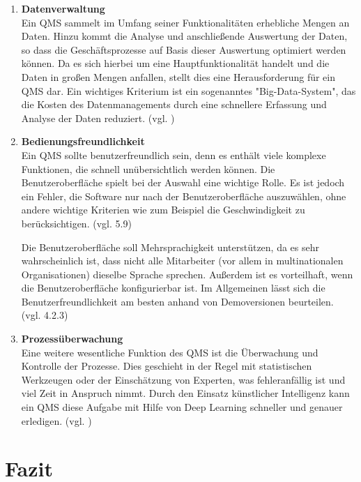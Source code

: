 \documentclass[11pt]{scrartcl}       %
\begin{document}
\begin{enumerate}

\item[] \textbf{Datenverwaltung} \\
Ein QMS sammelt im Umfang seiner Funktionalitäten erhebliche Mengen an Daten. Hinzu kommt die Analyse und anschließende Auswertung der Daten, so dass die Geschäftsprozesse auf Basis dieser Auswertung optimiert werden können. Da es sich hierbei um eine Hauptfunktionalität handelt und die Daten in großen Mengen anfallen, stellt dies eine Herausforderung für ein QMS dar. Ein wichtiges Kriterium ist ein sogenanntes "Big-Data-System", das die Kosten des Datenmanagements durch eine schnellere Erfassung und Analyse der Daten reduziert. (vgl. \cite{alexandrova2020Information})

\item[] \textbf{Bedienungsfreundlichkeit} \\ 
Ein QMS sollte benutzerfreundlich sein, denn es enthält viele komplexe Funktionen, die schnell unübersichtlich werden können. Die Benutzeroberfläche spielt bei der Auswahl eine wichtige Rolle. Es ist jedoch ein Fehler, die Software nur nach der Benutzeroberfläche auszuwählen, ohne andere wichtige Kriterien wie zum Beispiel die Geschwindigkeit zu berücksichtigen. (vgl. \cite{teich2008richtige} 5.9)

Die Benutzeroberfläche soll Mehrsprachigkeit unterstützen, da es sehr wahrscheinlich ist, dass nicht alle Mitarbeiter (vor allem in multinationalen Organisationen) dieselbe Sprache sprechen. Außerdem ist es vorteilhaft, wenn die Benutzeroberfläche konfigurierbar ist. Im Allgemeinen lässt sich die Benutzerfreundlichkeit am besten anhand von Demoversionen beurteilen. (vgl. \cite{pfeifer2021masing} 4.2.3)

\item[] \textbf{Prozessüberwachung} \\
Eine weitere wesentliche Funktion des QMS ist die Überwachung und Kontrolle der Prozesse. Dies geschieht in der Regel mit statistischen Werkzeugen oder der Einschätzung von Experten, was fehleranfällig ist und viel Zeit in Anspruch nimmt. Durch den Einsatz künstlicher Intelligenz kann ein QMS diese Aufgabe mit Hilfe von Deep Learning schneller und genauer erledigen. (vgl. \cite{alexandrova2020Information})
\end{enumerate}


\section{Fazit}
\end{document}
